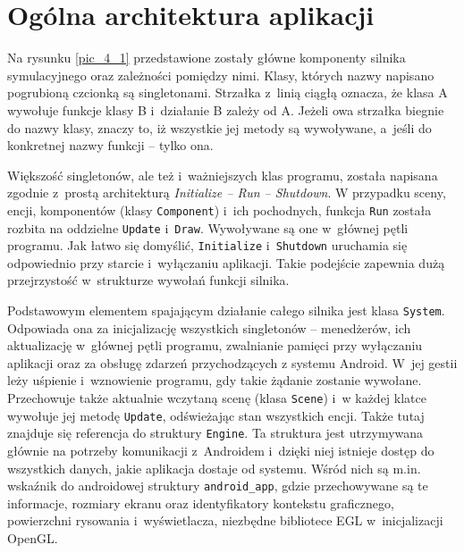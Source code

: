 	\section{Ogólna architektura aplikacji}
	\label{t:praktyka:ogolne}
	
	
	
	Na rysunku \ref{pic_4_1} przedstawione zostały główne komponenty silnika symulacyjnego oraz zależności pomiędzy nimi. Klasy, których nazwy napisano pogrubioną czcionką są singletonami. Strzałka z~linią ciągłą oznacza, że klasa A wywołuje funkcje klasy B i~działanie B zależy od A. Jeżeli owa strzałka biegnie do nazwy klasy, znaczy to, iż wszystkie jej metody są wywoływane, a~jeśli do konkretnej nazwy funkcji -- tylko ona.
	
	Większość singletonów, ale też i~ważniejszych klas programu, została napisana zgodnie z~prostą architekturą \emph{Initialize -- Run -- Shutdown}. W przypadku sceny, encji, komponentów (klasy \texttt{Component}) i~ich pochodnych, funkcja \texttt{Run} została rozbita na oddzielne \texttt{Update} i~\texttt{Draw}. Wywoływane są one w~głównej pętli programu. Jak łatwo się domyślić, \texttt{Initialize} i~\texttt{Shutdown} uruchamia się odpowiednio przy starcie i~wyłączaniu aplikacji. Takie podejście zapewnia dużą przejrzystość w~strukturze wywołań funkcji silnika.
	
	Podstawowym elementem spajającym działanie całego silnika jest klasa \texttt{System}. Odpowiada ona za inicjalizację wszystkich singletonów -- menedżerów, ich aktualizację w~głównej pętli programu, zwalnianie pamięci przy wyłączaniu aplikacji oraz za obsługę zdarzeń przychodzących z systemu Android. W~jej gestii leży uśpienie i~wznowienie programu, gdy takie żądanie zostanie wywołane. Przechowuje także aktualnie wczytaną scenę (klasa \texttt{Scene}) i~w każdej klatce wywołuje jej metodę \texttt{Update}, odświeżając stan wszystkich encji. Także tutaj znajduje się referencja do struktury \texttt{Engine}. Ta struktura jest utrzymywana głównie na potrzeby komunikacji z~Androidem i~dzięki niej istnieje dostęp do wszystkich danych, jakie aplikacja dostaje od systemu. Wśród nich są m.in. wskaźnik do androidowej struktury \texttt{android\_app}, gdzie przechowywane są te informacje, rozmiary ekranu oraz identyfikatory kontekstu graficznego, powierzchni rysowania i~wyświetlacza, niezbędne bibliotece EGL w~inicjalizacji OpenGL.
	
